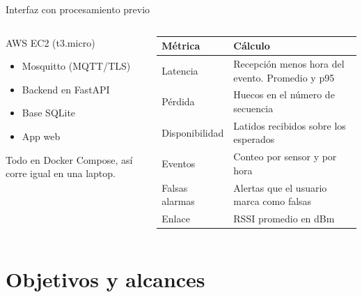 \documentclass[aspectratio=169,10pt]{beamer}
\begin{document}
\begin{frame}{Interfaz con procesamiento previo}
  \begin{columns}[T]
    \begin{block}{AWS EC2 (t3.micro)}
      \small
      \begin{itemize}
        \item Mosquitto (MQTT/TLS)
        \item Backend en FastAPI
        \item Base SQLite
        \item App web
      \end{itemize}
      \footnotesize Todo en Docker Compose, así corre igual en una laptop.
    \end{block}
    \small
    \renewcommand{\arraystretch}{1.25}
    \begin{tabular}{@{}l>{\raggedright\arraybackslash}p{5.2cm}@{}}
      \toprule
      \textbf{Métrica} & \textbf{Cálculo} \\
      \midrule
      Latencia & Recepción menos hora del evento. Promedio y p95 \\
      Pérdida & Huecos en el número de secuencia \\
      Disponibilidad & Latidos recibidos sobre los esperados \\
      Eventos & Conteo por sensor y por hora \\
      Falsas alarmas & Alertas que el usuario marca como falsas \\
      Enlace & RSSI promedio en dBm \\
      \bottomrule
    \end{tabular}
  \end{columns}
\end{frame}

\section{Objetivos y alcances}
\end{document}
